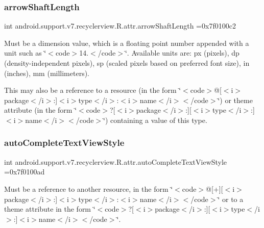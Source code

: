 \subsubsection{\texorpdfstring{arrow\+Shaft\+Length}{arrowShaftLength}}
{\footnotesize\ttfamily int android.\+support.\+v7.\+recyclerview.\+R.\+attr.\+arrow\+Shaft\+Length =0x7f0100c2\hspace{0.3cm}{\ttfamily [static]}}

Must be a dimension value, which is a floating point number appended with a unit such as \char`\"{}$<$code$>$14.\+5sp$<$/code$>$\char`\"{}. Available units are\+: px (pixels), dp (density-\/independent pixels), sp (scaled pixels based on preferred font size), in (inches), mm (millimeters). 

This may also be a reference to a resource (in the form \char`\"{}$<$code$>$@\mbox{[}$<$i$>$package$<$/i$>$\+:\mbox{]}$<$i$>$type$<$/i$>$\+:$<$i$>$name$<$/i$>$$<$/code$>$\char`\"{}) or theme attribute (in the form \char`\"{}$<$code$>$?\mbox{[}$<$i$>$package$<$/i$>$\+:\mbox{]}\mbox{[}$<$i$>$type$<$/i$>$\+:\mbox{]}$<$i$>$name$<$/i$>$$<$/code$>$\char`\"{}) containing a value of this type. \mbox{\label{classandroid_1_1support_1_1v7_1_1recyclerview_1_1R_1_1attr_ae5a62dab8a17bb704ce4cb4516d8cbf4}} 
\subsubsection{\texorpdfstring{auto\+Complete\+Text\+View\+Style}{autoCompleteTextViewStyle}}
{\footnotesize\ttfamily int android.\+support.\+v7.\+recyclerview.\+R.\+attr.\+auto\+Complete\+Text\+View\+Style =0x7f0100ad\hspace{0.3cm}{\ttfamily [static]}}

Must be a reference to another resource, in the form \char`\"{}$<$code$>$@\mbox{[}+\mbox{]}\mbox{[}$<$i$>$package$<$/i$>$\+:\mbox{]}$<$i$>$type$<$/i$>$\+:$<$i$>$name$<$/i$>$$<$/code$>$\char`\"{} or to a theme attribute in the form \char`\"{}$<$code$>$?\mbox{[}$<$i$>$package$<$/i$>$\+:\mbox{]}\mbox{[}$<$i$>$type$<$/i$>$\+:\mbox{]}$<$i$>$name$<$/i$>$$<$/code$>$\char`\"{}. \mbox{\label{classandroid_1_1support_1_1v7_1_1recyclerview_1_1R_1_1attr_affe4d93d5061752786241484da27b2e7}} 
